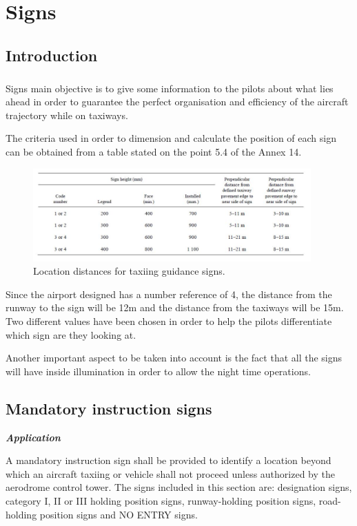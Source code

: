 \chapter{Signs}
	\section{Introduction}
	\paragraph{}Signs main objective is to give some information to the pilots about what lies ahead in order to guarantee the perfect organisation and efficiency of the aircraft trajectory while on taxiways. 
	
	The criteria used in order to dimension and calculate the position of each sign can be obtained from a table stated on the point 5.4 of the Annex 14.
	
	\begin{figure}[H]
		\centering
		\includegraphics[clip, trim=0cm 0cm 0cm 0cm, width=0.95\textwidth]{./images/Annex14/signstable}
		\caption{Location distances for taxiing guidance signs.} %
		\label{} %
	\end{figure}

	Since the airport designed has a number reference of 4, the distance from the runway to the sign will be 12m and the distance from the taxiways will be 15m. Two different values have been chosen in order to help the pilots differentiate which sign are they looking at. 
	
	Another important aspect to be taken into account is the fact that all the signs will have inside illumination in order to allow the night time operations.
	
	\section{Mandatory instruction signs}
	\textbf{\textit{Application}}
	
	A mandatory instruction sign shall be provided to identify a location beyond which an aircraft taxiing or vehicle shall not proceed unless authorized by the aerodrome control tower. The signs included in this section are: designation signs, category I, II or III holding position signs, runway-holding position signs, road-holding position signs and NO ENTRY signs.
	
